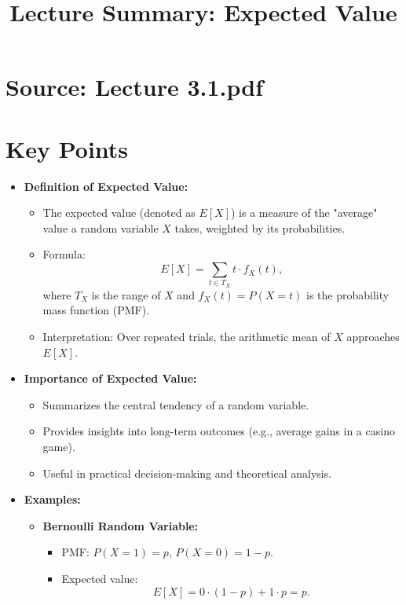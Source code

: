 \documentclass{article}
\title{Lecture Summary: Expected Value}
\author{}
\date{}
\begin{document}
\maketitle

\section*{Source: Lecture 3.1.pdf}

\section*{Key Points}

\begin{itemize}
  \item \textbf{Definition of Expected Value:}
    \begin{itemize}
      \item The expected value (denoted as $E[X]$) is a measure of the "average" value a random variable $X$ takes, weighted by its probabilities.
      \item Formula:
        \[
          E[X] = \sum_{t \in T_X} t \cdot f_X(t),
        \]
        where $T_X$ is the range of $X$ and $f_X(t) = P(X = t)$ is the probability mass function (PMF).
      \item Interpretation: Over repeated trials, the arithmetic mean of $X$ approaches $E[X]$.
    \end{itemize}

  \item \textbf{Importance of Expected Value:}
    \begin{itemize}
      \item Summarizes the central tendency of a random variable.
      \item Provides insights into long-term outcomes (e.g., average gains in a casino game).
      \item Useful in practical decision-making and theoretical analysis.
    \end{itemize}

  \item \textbf{Examples:}
    \begin{itemize}
      \item \textbf{Bernoulli Random Variable:}
        \begin{itemize}
          \item PMF: $P(X = 1) = p$, $P(X = 0) = 1 - p$.
          \item Expected value:
            \[
              E[X] = 0 \cdot (1 - p) + 1 \cdot p = p.
            \]
        \end{itemize}


\end{itemize}
\end{itemize}
\end{document}
